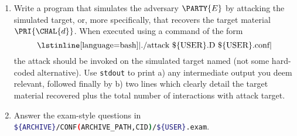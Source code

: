 \documentclass[crop={false},multi={true},tikz={true}]{standalone}
\begin{document}
\begin{enumerate}
\item Write a program that simulates the adversary $\PARTY{E}$ by attacking
      the simulated target, or, more specifically, that recovers the target 
      material $\PRI{\CHAL{d}}$.  
      When executed using a command of the form
      \[
      \mbox{\lstinline[language={bash}]|./attack \$\{USER\}.D \$\{USER\}.conf|}
      \]
      the attack should be invoked on the simulated target named (not some
      hard-coded alternative).  Use \lstinline[language={bash}]{stdout} to 
      print 
      a) any intermediate output you deem relevant, followed finally by 
      b) two lines which clearly detail the target material recovered plus
         the total number of interactions with attack target.
\item Answer the exam-style questions in  
      \lstinline[language={bash}]|${ARCHIVE}/CONF(ARCHIVE_PATH,CID)/${USER}.exam|.
\end{enumerate}


\ifstandalone
\printbibliography
\fi
\end{document}

